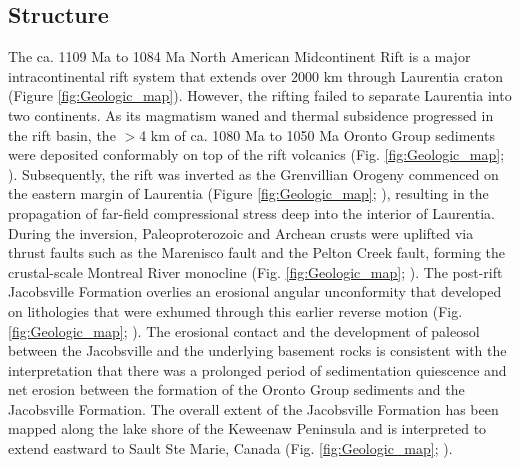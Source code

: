 \documentclass[draft]{agujournal2019}
\begin{document}
\subsection*{Structure}
The ca. 1109 Ma to 1084 Ma North American Midcontinent Rift is a major intracontinental rift system that extends over 2000 km through Laurentia craton (Figure \ref{fig:Geologic_map}). However, the rifting failed to separate Laurentia into two continents. As its magmatism waned and thermal subsidence progressed in the rift basin, the $>$4 km of ca. 1080 Ma to 1050 Ma Oronto Group sediments \cite{Swanson-Hysell2019a, Fuentes2022a} were deposited conformably on top of the rift volcanics (Fig. \ref{fig:Geologic_map}; \cite{Cannon1992a}). Subsequently, the rift was inverted as the Grenvillian Orogeny commenced on the eastern margin of Laurentia (Figure \ref{fig:Geologic_map}; ), resulting in the propagation of far-field compressional stress deep into the interior of Laurentia. During the inversion, Paleoproterozoic and Archean crusts were uplifted via thrust faults such as the Marenisco fault and the Pelton Creek fault, forming the crustal-scale Montreal River monocline (Fig. \ref{fig:Geologic_map}; \cite{Cannon1993a}). The post-rift Jacobsville Formation overlies an erosional angular unconformity that developed on lithologies that were exhumed through this earlier reverse motion (Fig. \ref{fig:Geologic_map}; ). The erosional contact and the development of paleosol between the Jacobsville and the underlying basement rocks is consistent with the interpretation that there was a prolonged period of sedimentation quiescence and net erosion between the formation of the Oronto Group sediments and the Jacobsville Formation. The overall extent of the Jacobsville Formation has been mapped along the lake shore of the Keweenaw Peninsula and is interpreted to extend eastward to Sault Ste Marie, Canada (Fig. \ref{fig:Geologic_map}; ). 

\end{document}
